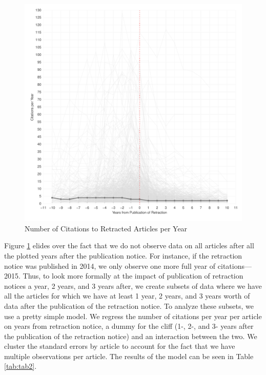 \documentclass[12pt, letterpaper]{article}
\begin{document}
\begin{figure}[H]
\centering
\includegraphics[scale=.7]{../figs/retracted_growth_curve.pdf}
\caption{Number of Citations to Retracted Articles per Year}
\label{fig:pre_post_retraction}
\end{figure}

Figure \ref{fig:pre_post_retraction} elides over the fact that we do not observe data on all articles after all the plotted years after the publication notice. For instance, if the retraction notice was published in 2014, we only observe one more full year of citations---2015. Thus, to look more formally at the impact of publication of retraction notices a year, 2 years, and 3 years after, we create subsets of data where we have all the articles for which we have at least 1 year, 2 years, and 3 years worth of data after the publication of the retraction notice. To analyze these subsets, we use a pretty simple model. We regress the number of citations per year per article on years from retraction notice, a dummy for the cliff (1-, 2-, and 3- years after the publication of the retraction notice) and an interaction between the two. We cluster the standard errors by article to account for the fact that we have multiple observations per article. The results of the model can be seen in Table \ref{tab:tab2}.


\end{document}
